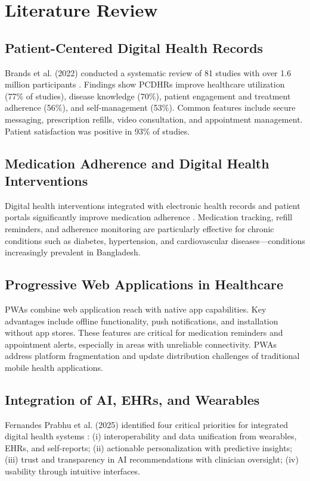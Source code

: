 \documentclass[12pt, a4paper]{report}
\begin{document}
\chapter{Literature Review}

\section{Patient-Centered Digital Health Records}
Brands et al. (2022) conducted a systematic review of 81 studies with over 1.6 million participants \cite{brands2022}. Findings show PCDHRs improve healthcare utilization (77\% of studies), disease knowledge (70\%), patient engagement and treatment adherence (56\%), and self-management (53\%). Common features include secure messaging, prescription refills, video consultation, and appointment management. Patient satisfaction was positive in 93\% of studies.

\section{Medication Adherence and Digital Health Interventions}
Digital health interventions integrated with electronic health records and patient portals significantly improve medication adherence \cite{brands2022}. Medication tracking, refill reminders, and adherence monitoring are particularly effective for chronic conditions such as diabetes, hypertension, and cardiovascular diseases—conditions increasingly prevalent in Bangladesh.

\section{Progressive Web Applications in Healthcare}
PWAs combine web application reach with native app capabilities. Key advantages include offline functionality, push notifications, and installation without app stores. These features are critical for medication reminders and appointment alerts, especially in areas with unreliable connectivity. PWAs address platform fragmentation and update distribution challenges of traditional mobile health applications.

\section{Integration of AI, EHRs, and Wearables}
Fernandes Prabhu et al. (2025) identified four critical priorities for integrated digital health systems \cite{fernandes2025}: (i) interoperability and data unification from wearables, EHRs, and self-reports; (ii) actionable personalization with predictive insights; (iii) trust and transparency in AI recommendations with clinician oversight; (iv) usability through intuitive interfaces.
\end{document}
